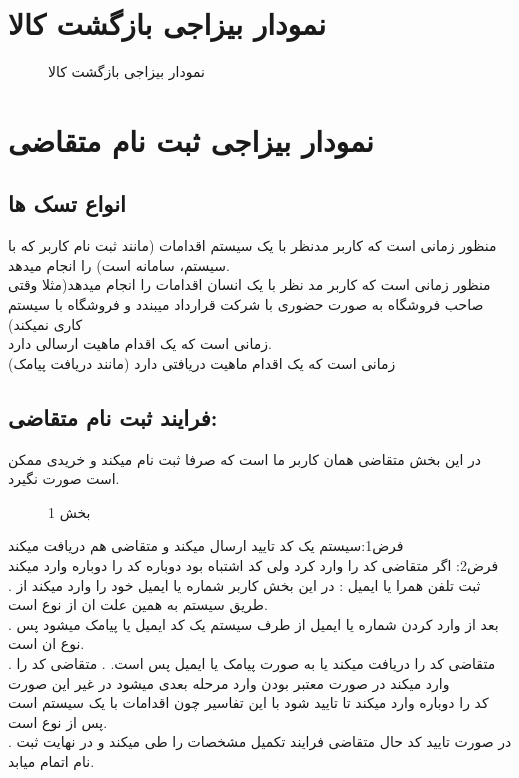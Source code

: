 \documentclass[12pt,onecolumn,a4paper]{article}
\begin{document}
\newpage

\section{نمودار بیزاجی بازگشت کالا}
\begin{figure}[!h]
\caption{   نمودار بیزاجی بازگشت کالا }\label{revb}
\end{figure}

\section{نمودار بیزاجی  ثبت نام متقاضی }
\subsection{انواع تسک ها}

 منظور زمانی است که کاربر مدنظر با یک سیستم اقدامات (مانند ثبت نام کاربر که با سیستم، سامانه است) را انجام میدهد.\\
 منظور زمانی است که کاربر مد نظر با یک انسان اقدامات را انجام میدهد(مثلا وقتی صاحب فروشگاه به صورت حضوری با شرکت قرارداد میبندد و فروشگاه با سیستم کاری نمیکند)\\
 زمانی است که یک اقدام ماهیت ارسالی دارد.\\
 زمانی است که یک اقدام ماهیت دریافتی دارد (مانند دریافت پیامک)\\

\subsection{ فرایند ثبت نام متقاضی: }

در این بخش متقاضی همان کاربر ما است که صرفا ثبت نام میکند و خریدی ممکن است صورت نگیرد.\\

\begin{figure}[ht]
\caption{ بخش 1 }\label{biz}
\end{figure}

فرض1:سیستم یک کد تایید ارسال میکند و متقاضی هم دریافت میکند \\
فرض2: اگر متقاضی کد را وارد کرد ولی کد اشتباه بود دوباره کد را دوباره وارد میکند \\
.	ثبت تلفن همرا یا ایمیل : در این بخش کاربر شماره یا ایمیل خود را وارد میکند از طریق سیستم به همین علت    ان از نوع   است.\\
.	بعد از وارد کردن شماره یا ایمیل از طرف سیستم یک کد ایمیل یا پیامک میشود پس نوع ان   است.\\
.	متقاضی کد را دریافت میکند یا به صورت پیامک یا ایمیل پس   است.
.	متقاضی کد را وارد میکند در صورت معتبر بودن وارد مرحله بعدی میشود در غیر این صورت\\ کد را دوباره وارد میکند تا تایید شود با این تفاسیر چون اقدامات با یک سیستم است پس از نوع   است.\\
.	در صورت تایید کد حال متقاضی فرایند تکمیل مشخصات را طی میکند و در نهایت ثبت نام اتمام میابد.\\
\end{document}
